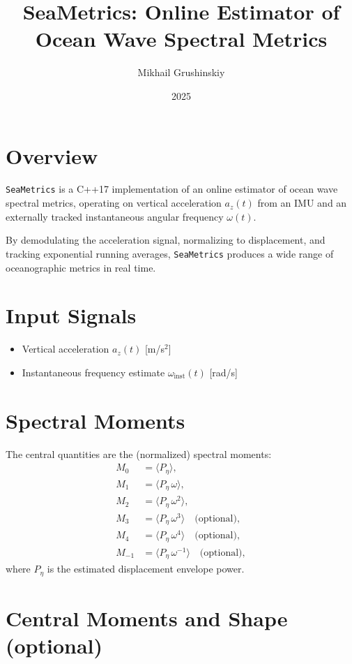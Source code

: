 \documentclass[11pt]{article}
\title{SeaMetrics: Online Estimator of Ocean Wave Spectral Metrics}
\author{Mikhail Grushinskiy}
\date{2025}
\begin{document}
\maketitle

\section{Overview}

\texttt{SeaMetrics} is a C++17 implementation of an online estimator of ocean wave
spectral metrics, operating on vertical acceleration $a_z(t)$ from an IMU and an externally
tracked instantaneous angular frequency $\omega(t)$. 

By demodulating the acceleration signal, normalizing to displacement,
and tracking exponential running averages, \texttt{SeaMetrics} produces
a wide range of oceanographic metrics in real time.

\section{Input Signals}

\begin{itemize}
  \item Vertical acceleration $a_z(t)$ [m/s$^2$]
  \item Instantaneous frequency estimate $\omega_{\text{inst}}(t)$ [rad/s]
\end{itemize}

\section{Spectral Moments}

The central quantities are the (normalized) spectral moments:
\begin{align}
M_0 &= \langle P_{\eta} \rangle, \\
M_1 &= \langle P_{\eta} \, \omega \rangle, \\
M_2 &= \langle P_{\eta} \, \omega^2 \rangle, \\
M_3 &= \langle P_{\eta} \, \omega^3 \rangle \quad \text{(optional)}, \\
M_4 &= \langle P_{\eta} \, \omega^4 \rangle \quad \text{(optional)}, \\
M_{-1} &= \langle P_{\eta} \, \omega^{-1} \rangle \quad \text{(optional)},
\end{align}
where $P_{\eta}$ is the estimated displacement envelope power.

\section{Central Moments and Shape (optional)}
\end{document}
